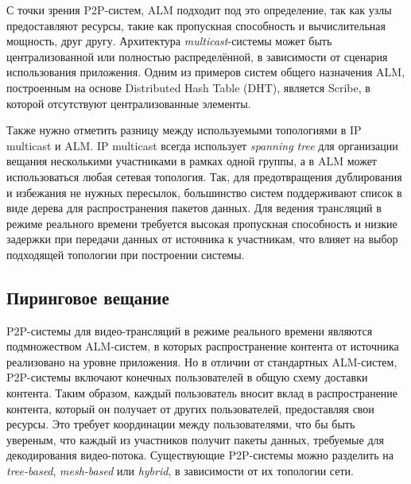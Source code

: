 		С точки зрения P2P-систем, ALM подходит под это определение, так как узлы предоставляют ресурсы, такие как
		пропускная способность и вычислительная мощность, друг другу. Архитектура \textit{multicast}-системы может быть
		централизованной или полностью распределённой, в зависимости от сценария использования приложения. Одним из
		примеров систем общего назначения ALM, построенным на основе Distributed Hash Table (DHT), является Scribe, в
		которой отсутствуют централизованные элементы.

		Также нужно отметить разницу между используемыми топологиями в IP multicast и ALM. IP multicast всегда
		использует \textit{spanning tree} для организации вещания несколькими участниками в рамках одной группы, а в ALM
		может использоваться любая сетевая топология. Так, для предотвращения дублирования и избежания не нужных
		пересылок, большинство систем поддерживают список в виде дерева для распространения пакетов данных. Для ведения
		трансляций в режиме реального времени требуется высокая пропускная способность и низкие задержки при передачи
		данных от источника к участникам, что влияет на выбор подходящей топологии при построении системы.

	\subsection{Пиринговое вещание}
	P2P-системы для видео-трансляций в режиме реального времени являются подмножеством ALM-систем, в которых
	распространение контента от источника реализовано на уровне приложения. Но в отличии от стандартных ALM-систем,
	P2P-системы включают конечных пользователей в общую схему доставки контента. Таким образом, каждый пользователь
	вносит вклад в распространение контента, который он получает от других пользователей, предоставляя свои ресурсы.
	Это требует координации между пользователями, что бы быть увереным, что каждый из участников получит пакеты данных,
	требуемые для декодирования видео-потока. Существующие P2P-системы можно разделить на \textit{tree-based},
	\textit{mesh-based} или \textit{hybrid}, в зависимости от их топологии сети.

